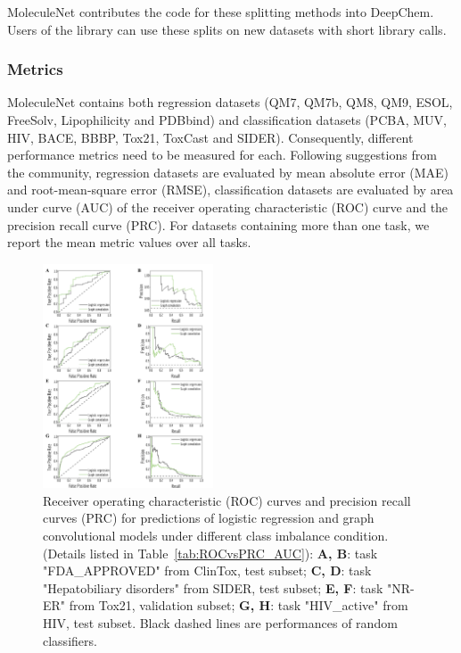 MoleculeNet contributes the code for these splitting methods into DeepChem. Users of the library can use these splits on new datasets with short library calls.


\subsubsection{Metrics}

MoleculeNet contains both regression datasets (QM7, QM7b, QM8, QM9, ESOL, FreeSolv, Lipophilicity and PDBbind) and classification datasets (PCBA, MUV, HIV, BACE, BBBP, Tox21, ToxCast and SIDER). Consequently, different performance metrics need to be measured for each. Following suggestions from the community\cite{metric_suggestion}, regression datasets are evaluated by mean absolute error (MAE) and root-mean-square error (RMSE), classification datasets are evaluated by area under curve (AUC) of the receiver operating characteristic (ROC) curve\cite{AUC-ROC} and the precision recall curve (PRC)\cite{PRC}. For datasets containing more than one task, we report the mean metric values over all tasks.

\begin{figure}[!h]
  \centering
  \small
  \includegraphics[width=0.45\textwidth]{Images/ROCvsPRC.png}
  \caption{Receiver operating characteristic (ROC) curves and precision recall curves (PRC) for predictions of logistic regression and graph convolutional models under different class imbalance condition.(Details listed in Table~\ref{tab:ROCvsPRC_AUC}): \textbf{A, B}: task "FDA\_APPROVED" from ClinTox, test subset; \textbf{C, D}: task "Hepatobiliary disorders" from SIDER, test subset; \textbf{E, F}: task "NR-ER" from Tox21, validation subset; \textbf{G, H}: task "HIV\_active" from HIV, test subset. Black dashed lines are performances of random classifiers.}
  \label{fig:ROCvsPRC}
\end{figure}

